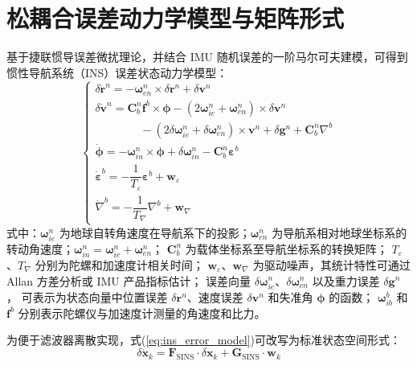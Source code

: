 \section{松耦合误差动力学模型与矩阵形式}
基于捷联惯导误差微扰理论，并结合 IMU 随机误差的一阶马尔可夫建模，可得到惯性导航系统（INS）误差状态动力学模型\cite{yan2019strapdown}：
\begin{equation}
    \begin{cases}
        \delta \dot{\bm{r}}^n = -\bm{\omega}_{en}^n \times \delta \bm{r}^n + \delta \bm{v}^n                                                           \\[4pt]
        \delta \dot{\bm{v}}^n = \bm{C}_b^n \bm{f}^b \times \bm{\phi} - \left(2\bm{\omega}_{ie}^n + \bm{\omega}_{en}^n\right) \times \delta \bm{v}^n    \\[4pt]
        \quad\quad\quad\quad -\left(2\delta\bm{\omega}_{ie}^n + \delta\bm{\omega}_{en}^n\right) \times \bm{v}^n +\delta \bm{g}^n + \bm{C}_b^n \nabla^b \\[4pt]
        \dot{\bm{\phi}} = -\bm{\omega}_{in}^n \times \bm{\phi} + \delta\bm{\omega}_{in}^n - \bm{C}_b^n \bm{\varepsilon}^b                              \\[4pt]
        \dot{\bm{\varepsilon}}^b = -\dfrac{1}{T_\varepsilon} \bm{\varepsilon}^b + \bm{w}_\varepsilon                                                   \\[4pt]
        \dot{\nabla}^b = -\dfrac{1}{T_\nabla} \nabla^b + \bm{w}_\nabla
    \end{cases}
    \label{eq:ins_error_model}
\end{equation}
式中：$\bm{\omega}_{ie}^n$ 为地球自转角速度在导航系下的投影；$\bm{\omega}_{en}^n$ 为导航系相对地球坐标系的转动角速度；$\bm{\omega}_{in}^n = \bm{\omega}_{ie}^n + \bm{\omega}_{en}^n$；
$\bm{C}_b^n$ 为载体坐标系至导航坐标系的转换矩阵；
$T_\varepsilon$、$T_\nabla$ 分别为陀螺和加速度计相关时间；
$\bm{w}_\varepsilon$、$\bm{w}_\nabla$ 为驱动噪声，其统计特性可通过 Allan 方差分析或 IMU 产品指标估计\cite{wang2018using}；
误差向量 $\delta \bm{\omega}_{ie}^n$、$\delta \bm{\omega}_{en}^n$ 以及重力误差 $\delta \bm{g}^n$，
可表示为状态向量中位置误差 $\delta \bm{r}^n$、速度误差 $\delta \bm{v}^n$ 和失准角 $\bm{\phi}$ 的函数；
$\bm{\omega}_{ib}^b$ 和 $\bm{f}^b$ 分别表示陀螺仪与加速度计测量的角速度和比力。

为便于滤波器离散实现，式(\ref{eq:ins_error_model})可改写为标准状态空间形式：
\begin{equation}
    \delta \dot{\bm{x}}_k = \bm{F}_\text{SINS} \cdot \delta \bm{x}_k + \bm{G}_\text{SINS} \cdot \bm{w}_k
    \label{eq:matrix_dynamic}
\end{equation}


